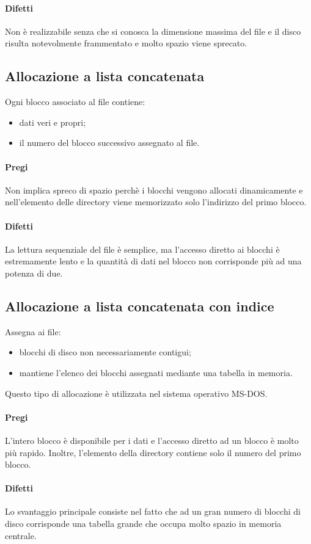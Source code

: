 \documentclass[12pt, letterpaper]{report}
\begin{document}
	\paragraph{Difetti} Non è realizzabile senza che si conosca la dimensione massima del file e il disco risulta notevolmente frammentato e molto spazio viene sprecato.
	\subsection{Allocazione a lista concatenata}
	Ogni blocco associato al file contiene:
	\begin{itemize}
		\item dati veri e propri;
		\item il numero del blocco successivo assegnato al file.
	\end{itemize}
	\paragraph{Pregi} Non implica spreco di spazio perchè i blocchi vengono allocati dinamicamente e nell'elemento delle directory viene memorizzato solo l'indirizzo del primo blocco.
	\paragraph{Difetti} La lettura sequenziale del file è semplice, ma l'accesso diretto ai blocchi è estremamente lento e la quantità di dati nel blocco non corrisponde più ad una potenza di due.
	\subsection{Allocazione a lista concatenata con indice}
	Assegna ai file:
	\begin{itemize}
		\item blocchi di disco non necessariamente contigui;
		\item mantiene l'elenco dei blocchi assegnati mediante una tabella in memoria.
	\end{itemize}
	Questo tipo di allocazione è utilizzata nel sistema operativo MS-DOS.
	\paragraph{Pregi} L'intero blocco è disponibile per i dati e l'accesso diretto ad un blocco è molto più rapido. Inoltre, l'elemento della directory contiene solo il numero del primo blocco.
	\paragraph{Difetti} Lo svantaggio principale consiste nel fatto che ad un gran numero di blocchi di disco corrisponde una tabella grande che occupa molto spazio in memoria centrale.
\end{document}
